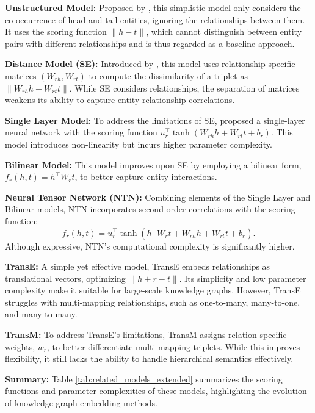 \documentclass[11pt]{article}
\begin{document}
\textbf{Unstructured Model:} Proposed by \citet{bordes2013b}, this simplistic model only considers the co-occurrence of head and tail entities, ignoring the relationships between them. It uses the scoring function $\|h - t\|$, which cannot distinguish between entity pairs with different relationships and is thus regarded as a baseline approach.

\textbf{Distance Model (SE):} Introduced by \citet{bordes2011}, this model uses relationship-specific matrices $(W_{rh}, W_{rt})$ to compute the dissimilarity of a triplet as $\|W_{rh}h - W_{rt}t\|$. While SE considers relationships, the separation of matrices weakens its ability to capture entity-relationship correlations.

\textbf{Single Layer Model:} To address the limitations of SE, \citet{socher2013} proposed a single-layer neural network with the scoring function $u_r^\top \tanh(W_{rh}h + W_{rt}t + b_r)$. This model introduces non-linearity but incurs higher parameter complexity.

\textbf{Bilinear Model:} This model \citep{sutskever2009, jenatton2012} improves upon SE by employing a bilinear form, $f_r(h, t) = h^\top W_rt$, to better capture entity interactions.

\textbf{Neural Tensor Network (NTN):} Combining elements of the Single Layer and Bilinear models, NTN \citep{socher2013} incorporates second-order correlations with the scoring function:
\[
f_r(h, t) = u_r^\top \tanh(h^\top W_r t + W_{rh}h + W_{rt}t + b_r).
\]
Although expressive, NTN’s computational complexity is significantly higher.

\textbf{TransE:} A simple yet effective model, TransE \citep{bordes2013b} embeds relationships as translational vectors, optimizing $\|h + r - t\|$. Its simplicity and low parameter complexity make it suitable for large-scale knowledge graphs. However, TransE struggles with multi-mapping relationships, such as one-to-many, many-to-one, and many-to-many.

\textbf{TransM:} To address TransE's limitations, TransM \citep{bordes2013b} assigns relation-specific weights, $w_r$, to better differentiate multi-mapping triplets. While this improves flexibility, it still lacks the ability to handle hierarchical semantics effectively.

\textbf{Summary:} Table \ref{tab:related_models_extended} summarizes the scoring functions and parameter complexities of these models, highlighting the evolution of knowledge graph embedding methods.
\end{document}
